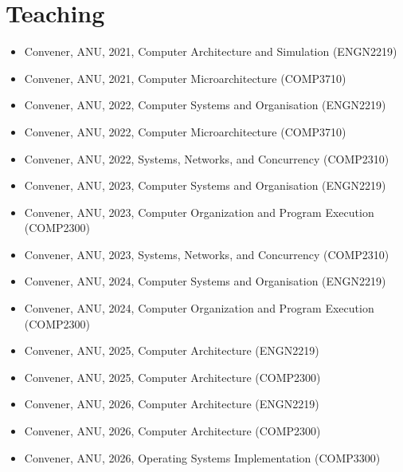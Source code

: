 \documentclass[11pt,a4paper,sans]{moderncv}
\begin{document}
\section{Teaching}
{\small
\begin{itemize}
\item Convener, ANU, 2021, Computer Architecture and Simulation (ENGN2219)
\item Convener, ANU, 2021, Computer Microarchitecture (COMP3710) 
\item Convener, ANU, 2022, Computer Systems and Organisation (ENGN2219)
\item Convener, ANU, 2022, Computer Microarchitecture (COMP3710) 
\item Convener, ANU, 2022, Systems, Networks, and Concurrency (COMP2310) 
\item Convener, ANU, 2023, Computer Systems and Organisation (ENGN2219) 
\item Convener, ANU, 2023, Computer Organization and Program Execution (COMP2300) 
\item Convener, ANU, 2023, Systems, Networks, and Concurrency (COMP2310) 
\item Convener, ANU, 2024, Computer Systems and Organisation (ENGN2219) 
\item Convener, ANU, 2024, Computer Organization and Program Execution (COMP2300)
\item Convener, ANU, 2025, Computer Architecture (ENGN2219) 
\item Convener, ANU, 2025, Computer Architecture (COMP2300)
\item Convener, ANU, 2026, Computer Architecture (ENGN2219) 
\item Convener, ANU, 2026, Computer Architecture (COMP2300)
\item Convener, ANU, 2026, Operating Systems Implementation (COMP3300)
\end{itemize}
}
\end{document}
